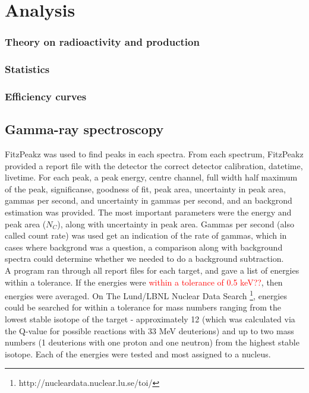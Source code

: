 \documentclass[a4paper,11pt,twoside]{book}
\begin{document}
%
%
%
%
%
%
%



\chapter{Analysis}\label{Chapter:Analysis}
\noindent

\subsection{Theory on radioactivity and production}

\subsection{Statistics}

\subsection{Efficiency curves}

\section{Gamma-ray spectroscopy}

FitzPeakz was used to find peaks in each spectra. From each spectrum, FitzPeakz provided a report file with the detector the correct detector calibration, datetime, livetime. For each peak, a peak energy, centre channel, full width half maximum of the peak, significanse, goodness of fit, peak area, uncertainty in peak area, gammas per second, and uncertainty in gammas per second, and an backgrond estimation was provided. The most important parameters were the energy and peak area ($N_C$), along with uncertainty in peak area. Gammas per second (also called count rate) was used get an indication of the rate of gammas, which in cases where backgrond was a question, a comparison along with background spectra could determine whether we needed to do a background subtraction.  \\

\noindent 
A program ran through all report files for each target, and gave a list of energies within a tolerance. If the energies were \textcolor{red}{within a tolerance of 0.5 keV??}, then energies were averaged.  On The Lund/LBNL Nuclear Data Search \footnote{http://nucleardata.nuclear.lu.se/toi/}, energies could be searched for within a tolerance for mass numbers ranging from the lowest stable isotope of the target - approximately 12 (which was calculated via the Q-value for possible reactions with 33 MeV deuterions) and up to two mass numbers (1 deuterions with one proton and one neutron) from the highest stable isotope. Each of the energies were tested and most assigned to a nucleus. 
\end{document}
